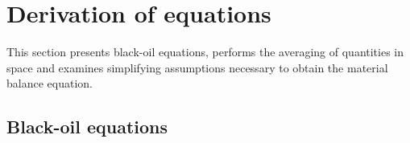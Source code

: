 \documentclass[authoryear,preprint,review,11pt]{elsarticle}
\begin{document}
%
%
%
%
%

\section{Derivation of equations}

This section presents black-oil equations, performs the averaging of quantities in space and examines simplifying assumptions necessary to obtain the material balance equation.

\subsection{Black-oil equations}


\end{document}
